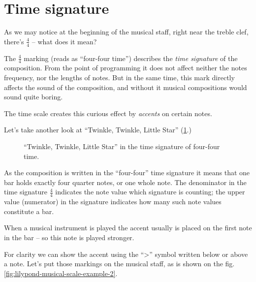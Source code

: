 \documentclass[../sparc.tex]{subfiles}
\begin{document}
\section{Time signature}

As we may notice at the beginning of the musical staff, right near the treble
clef, there's $\frac{4}{4}$ -- what does it mean?

The $\frac{4}{4}$ marking (reads as ``four-four time'') describes the \emph{time
signature} of the composition.  From the point of programming it does not affect
neither the notes frequency, nor the lengths of notes.  But in the same time,
this mark directly affects the sound of the composition, and without it musical
compositions would sound quite boring.

The time scale creates this curious effect by \emph{accents} on certain notes.

Let's take another look at ``Twinkle, Twinkle, Little Star''
(\ref{fig:lilypond-musical-scale-example-1}.)

\begin{figure}[ht]
  \centering
  \caption{``Twinkle, Twinkle, Little Star'' in the time signature of four-four
    time.}
  \label{fig:lilypond-musical-scale-example-1}
\end{figure}

As the composition is written in the ``four-four'' time signature it means that
one bar holds exactly four quarter notes, or one whole note.  The denominator in
the time signature $\frac{4}{4}$ indicates the note value which signature is
counting; the upper value (numerator) in the signature indicates how many such
note values constitute a bar.

When a musical instrument is played the accent usually is placed on the first
note in the bar -- so this note is played stronger.

For clarity we can show the accent using the ``>'' symbol written below or above
a note.  Let's put those markings on the musical staff, as is shown on the
fig. \ref{fig:lilypond-musical-scale-example-2}.
\end{document}
